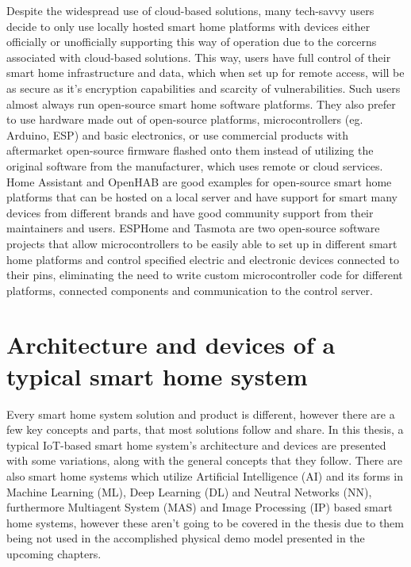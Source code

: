 Despite the widespread use of cloud-based solutions, many tech-savvy users decide to only use locally hosted smart home platforms with devices either officially or unofficially supporting this way of operation due to the corcerns associated with cloud-based solutions. This way, users have full control of their smart home infrastructure and data, which when set up for remote access, will be as secure as it's encryption capabilities and scarcity of vulnerabilities. Such users almost always run open-source smart home software platforms. They also prefer to use hardware made out of open-source platforms, microcontrollers (eg. Arduino, ESP) and basic electronics, or use commercial products with aftermarket open-source firmware flashed onto them instead of utilizing the original software from the manufacturer, which uses remote or cloud services. Home Assistant and OpenHAB are good examples for open-source smart home platforms that can be hosted on a local server and have support for smart many devices from different brands and have good community support from their maintainers and users. \cite{HAHomepage} \cite{openHABHomepage} ESPHome and Tasmota are two open-source software projects that allow microcontrollers to be easily able to set up in different smart home platforms and control specified electric and electronic devices connected to their pins, eliminating the need to write custom microcontroller code for different platforms, connected components and communication to the control server. \cite{ESPHomeHomepage} \cite{TasmotaHomepage}

\section{Architecture and devices of a typical smart home system}

Every smart home system solution and product is different, however there are a few key concepts and parts, that most solutions follow and share. In this thesis, a typical IoT-based smart home system's architecture and devices are presented with some variations, along with the general concepts that they follow. There are also smart home systems which utilize Artificial Intelligence (AI) and its forms in Machine Learning (ML), Deep Learning (DL) and Neutral Networks (NN), furthermore Multiagent System (MAS) and Image Processing (IP) based smart home systems, however these aren't going to be covered in the thesis due to them being not used in the accomplished physical demo model presented in the upcoming chapters. \cite{ChakSHS}

